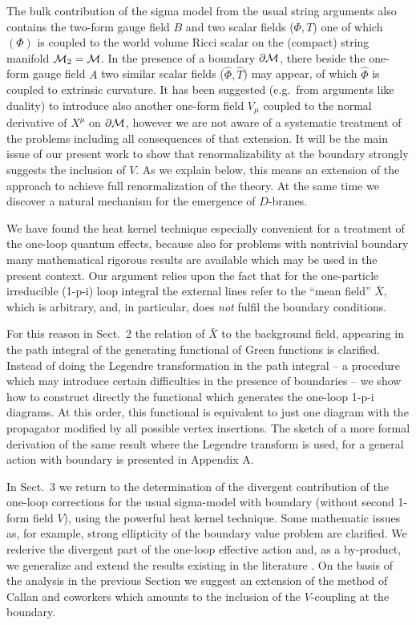 \documentclass[a4paper,12pt]{article}
\begin{document}
The bulk contribution of the sigma 
model from the usual string arguments also contains the 
two-form gauge field $B$ and two scalar fields ($\Phi, T$) one 
of which $(\Phi)$ is coupled to the world volume
Ricci scalar on the 
(compact) string manifold ${\cal M}_2 ={\cal M}$. In the presence of a 
boundary $\partial {\cal M}$, there beside the one-form gauge field 
$A$ two similar scalar fields ($\hat \Phi, \hat T$) may 
appear, of which $\hat \Phi$ is coupled to extrinsic 
curvature. It has been suggested 
\cite{dornotto86,DLP89,Leigh89,behrndtdorn92,dornotto96}
(e.g.\ from arguments like 
duality) to introduce also  another one-form field $V_\mu$ 
coupled to the normal derivative of $X^\mu$ on
 $\partial {\cal M}$, however we are not aware 
of a systematic treatment of the problems including all 
consequences of that extension. It will be the main issue of 
our present work to show that renormalizability at the 
boundary strongly suggests the inclusion of $V$. As we explain below,
this means an extension of the approach \cite{Callan88}
to achieve full renormalization of the theory. 
At the same time we discover a natural mechanism for the
emergence of $D$-branes.

We have found the heat kernel technique \cite{Gilkey} especially 
convenient for a treatment of the one-loop quantum effects, 
because also for  problems with nontrivial boundary many 
mathematical rigorous results are available which may be 
used in the present context. Our argument 
relies upon the fact that for the one-particle irreducible
(1-p-i) loop 
integral the external lines refer to the ``mean field'' 
$\bar X$, which is arbitrary, and, in particular, does {\em 
not} fulfil the boundary conditions. 

For this reason in 
Sect.\ 2 the relation of $\bar X$ to the background field, 
appearing in the path integral of the generating functional 
of Green functions is clarified.  Instead of doing the 
Legendre transformation in the path integral -- a procedure
which may introduce certain difficulties in the presence
of boundaries -- we show how to construct directly the functional
which generates the one-loop 1-p-i 
diagrams. At this order, this functional is equivalent
to just one diagram with the propagator modified by all
possible vertex insertions. The sketch of a 
 more formal derivation of the same result where the Legendre
transform is used, for a general action with boundary 
is presented in Appendix A. 

In Sect.\ 3 we return to the determination of the divergent 
contribution of the one-loop corrections for the usual 
sigma-model with boundary (without second 1-form field $V$), 
using the powerful heat kernel technique.  Some
mathematic issues as, for example, strong ellipticity
of the boundary value problem are clarified. We rederive the divergent
part of the one-loop effective action and, as a by-product, 
we generalize and extend
the results existing in the literature 
\cite{dornotto86,Callan88,Osborn91}. On the basis of the analysis in
the previous Section
we suggest an extension
of the method of Callan and coworkers \cite{Callan88} which
amounts to the inclusion of the $V$-coupling at the boundary.
\end{document}
